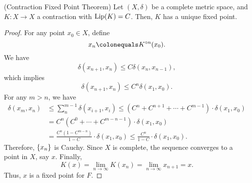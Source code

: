 \documentclass[12pt,twoside,draft]{book}
\begin{document}
\begin{theorem}
  (Contraction Fixed Point Theorem)
  Let $(X,\delta)$ be a complete metric space, and $K: X \to X$ a contraction with $\mathrm{Lip}(K) = C$.
  Then, $K$ has a unique fixed point.
  \label{thm:cfp}
  \begin{proof}
    For any point $x_0 \in X$, define
    \begin{equation*}
      x_n \ceq \itr{K}{n}(x_0).
    \end{equation*}
    We have
    \begin{equation*}
      \delta(x_{n+1}, x_n) \leq C \delta(x_n, x_{n-1}),
    \end{equation*}
    which implies
    \begin{equation*}
      \delta(x_{n+1}, x_n) \leq C^n \delta(x_1, x_0).
    \end{equation*}
    For any $m > n$, we have
    \begin{align*}
      \delta(x_m, x_n) &\leq \sum\limits_n^{m-1} \delta(x_{i+1}, x_i) 
        \leq (C^n + C^{n+1} + \cdots + C^{m-1}) \cdot \delta(x_1, x_0) \\
        & = C^n (C^{0} + \cdots + C^{m-n-1} ) \cdot \delta(x_1, x_0) \\
        & = \frac{C^n(1 - C^{m-n})}{1-C} \cdot \delta(x_1, x_0)
        \leq \frac{C^n}{1-C} \cdot \delta(x_1, x_0).
    \end{align*}
    Therefore, $\left \{ x_n \right \}$ is Cauchy.
    Since $X$ is complete, the sequence converges to a point in $X$, say $x$.
    Finally, 
    \begin{equation*}
      K(x) = \lim\limits_{n\to \infty} K(x_n) = \lim\limits_{n\to \infty} x_{n+1} = x.
    \end{equation*}
    Thus, $x$ is a fixed point for $F$.
  \end{proof}
\end{theorem}
\end{document}
